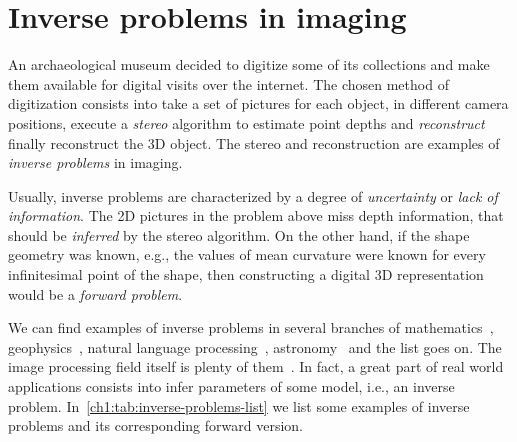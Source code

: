 \section{Inverse problems in imaging}

An archaeological museum decided to digitize some of its collections and make them available for digital visits over the internet. The chosen method of digitization consists into take a set of pictures for each object, in different camera positions, execute a \emph{stereo} algorithm to estimate point depths and \emph{reconstruct} finally reconstruct the 3D object. The stereo and reconstruction are examples of \emph{inverse problems} in imaging.

Usually, inverse problems are characterized by a degree of \emph{uncertainty} or \emph{lack of information}. The 2D pictures in the problem above miss depth information, that should be \emph{inferred} by the stereo algorithm. On the other hand, if the shape geometry was known, e.g., the values of mean curvature were known for every infinitesimal point of the shape, then constructing a digital 3D representation would be a \emph{forward problem}. 

We can find examples of inverse problems in several branches of mathematics~\cite{kirsch96}, geophysics~\cite{zhdanov15}, natural language processing~\cite{stroppa05}, astronomy~\cite{lucy94} and the list goes on. The image processing field itself is plenty of them~\cite{bertero98}. In fact, a great part of real world applications consists into infer parameters of some model, i.e., an inverse problem. In~\cref{ch1:tab:inverse-problems-list} we list some examples of inverse problems and its corresponding forward version.

